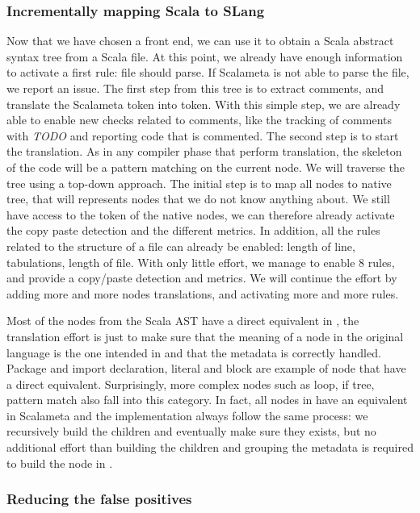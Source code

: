\subsubsection{Incrementally mapping Scala to SLang}
\label{subsubsec:scala_to_slang}
Now that we have chosen a front end, we can use it to obtain a Scala abstract syntax tree from a Scala file. 
At this point, we already have enough information to activate a first rule: file should parse.
If Scalameta is not able to parse the file, we report an issue.
The first step from this tree is to extract comments, and translate the Scalameta token into \slang{} token.
With this simple step, we are already able to enable new checks related to comments, like the tracking of comments with \emph{TODO} and reporting code that is commented.
The second step is to start the translation. 
As in any compiler phase that perform translation, the skeleton of the code will be a pattern matching on the current node. 
We will traverse the tree using a top-down approach. 
The initial step is to map all nodes to native tree, that will represents nodes that we do not know anything about. 
We still have access to the token of the native nodes, we can therefore already activate the copy paste detection and the different metrics. 
In addition, all the rules related to the structure of a file can already be enabled: length of line, tabulations, length of file.
With only little effort, we manage to enable 8 rules, and provide a copy/paste detection and metrics. 
We will continue the effort by adding more and more nodes translations, and activating more and more rules.

Most of the nodes from the Scala AST have a direct equivalent in \slang{}, the translation effort is just to make sure that the meaning of a node in the original language is the one intended in \slang{} and that the metadata is correctly handled. 
Package and import declaration, literal and block are example of node that have a direct equivalent.
Surprisingly, more complex nodes such as loop, if tree, pattern match also fall into this category.
In fact, all nodes in \slang{} have an equivalent in Scalameta and the implementation always follow the same process: we recursively build the children and eventually make sure they exists, but no additional effort than building the children and grouping the metadata is required to build the node in \slang{}.

\subsubsection{Reducing the false positives}
\label{subsubsec:reducing_false_positives}

